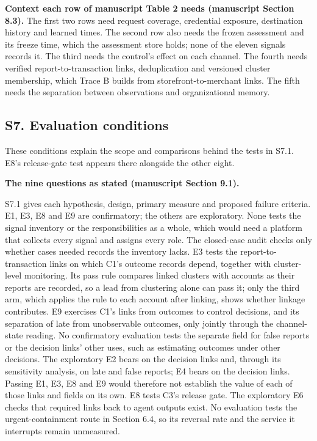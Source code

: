 \documentclass[
  11pt,
]{article}
\begin{document}
\textbf{Context each row of manuscript Table 2 needs (manuscript Section
8.3).} The first two rows need request coverage, credential exposure,
destination history and learned times. The second row also needs the
frozen assessment and its freeze time, which the assessment store holds;
none of the eleven signals records it. The third needs the control's
effect on each channel. The fourth needs verified report-to-transaction
links, deduplication and versioned cluster membership, which Trace B
builds from storefront-to-merchant links. The fifth needs the separation
between observations and organizational memory.

\FloatBarrier

\hypertarget{s7.-evaluation-conditions}{%
\subsection{S7. Evaluation conditions}\label{s7.-evaluation-conditions}}

\suppressfloats[t]

These conditions explain the scope and comparisons behind the tests in
S7.1. E8's release-gate test appears there alongside the other eight.

\textbf{The nine questions as stated (manuscript Section 9.1).}

S7.1 gives each hypothesis, design, primary measure and proposed failure
criteria. E1, E3, E8 and E9 are confirmatory; the others are
exploratory. None tests the signal inventory or the responsibilities as
a whole, which would need a platform that collects every signal and
assigns every role. The closed-case audit checks only whether cases
needed records the inventory lacks. E3 tests the report-to-transaction
links on which C1's outcome records depend, together with cluster-level
monitoring. Its pass rule compares linked clusters with accounts as
their reports are recorded, so a lead from clustering alone can pass it;
only the third arm, which applies the rule to each account after
linking, shows whether linkage contributes. E9 exercises C1's links from
outcomes to control decisions, and its separation of late from
unobservable outcomes, only jointly through the channel-state reading.
No confirmatory evaluation tests the separate field for false reports or
the decision links' other uses, such as estimating outcomes under other
decisions. The exploratory E2 bears on the decision links and, through
its sensitivity analysis, on late and false reports; E4 bears on the
decision links. Passing E1, E3, E8 and E9 would therefore not establish
the value of each of those links and fields on its own. E8 tests C3's
release gate. The exploratory E6 checks that required links back to
agent outputs exist. No evaluation tests the urgent-containment route in
Section 6.4, so its reversal rate and the service it interrupts remain
unmeasured.
\end{document}
